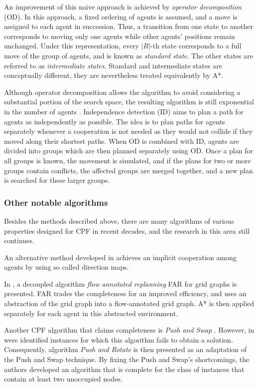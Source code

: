 An improvement of this naive approach is achieved by \emph{operator decomposition} (OD)\cite{standley10}.
In this approach, a fixed ordering of agents is assumed, and a move is assigned to each agent in succession.
Thus, a transition from one state to another corresponds to  moving only one agents while other agents' positions remain unchanged.
Under this representation, every $|R|$-th state corresponds to a full move of the group of agents, and is known as \emph{standard state}. 
The other states are referred to as \emph{intermediate states}.
Standard and intermediate states are conceptually different, they are nevertheless treated equivalently by A*.

Although operator decomposition allows the algorithm to avoid considering a substantial portion of the search space, the resulting algorithm is still exponential in the number of agents \cite{standley10}.
Independence detection (ID) aims to plan a path for agents as independently as possible.
The idea is to plan paths for agents separately whenever a cooperation is not needed as they would not collide if they moved along their shortest paths.
When OD is combined with ID, agents are divided into groups which are then planned separately using OD.
Once a plan for all groups is known, the movement is simulated, and if the plans for two or more groups contain conflicts,
the affected groups are merged together, and a new plan is searched for these larger groups.

\subsubsection{Other notable algorithms}

Besides the methods described above, there are many algorithms of various properties designed for CPF in recent decades, and the research in this area still continues. 

An alternative method developed in \cite{jansen08} achieves an implicit cooperation among agents by using so called direction maps.

In \cite{wang08}, a decoupled algorithm \emph{flow annotated replanning} FAR for grid graphs is presented.
FAR trades the completeness for an improved efficiency, and uses an abstraction of the grid graph into a flow-annotated grid graph.
A* is then applied separately for each agent in this abstracted environment.

Another CPF algorithm that claims completeness is \emph{Push and Swap} \cite{luna11}. 
However, in \cite{wilde13} were identified instances for which this algorithm fails to obtain a solution.
Consequently, algorithm \emph{Push and Rotate} is then presented as an adaptation of the Push and Swap technique. 
By fixing the Push and Swap’s shortcomings, the authors developed an algorithm that is complete for the class of instances that contain at least two unoccupied nodes.

